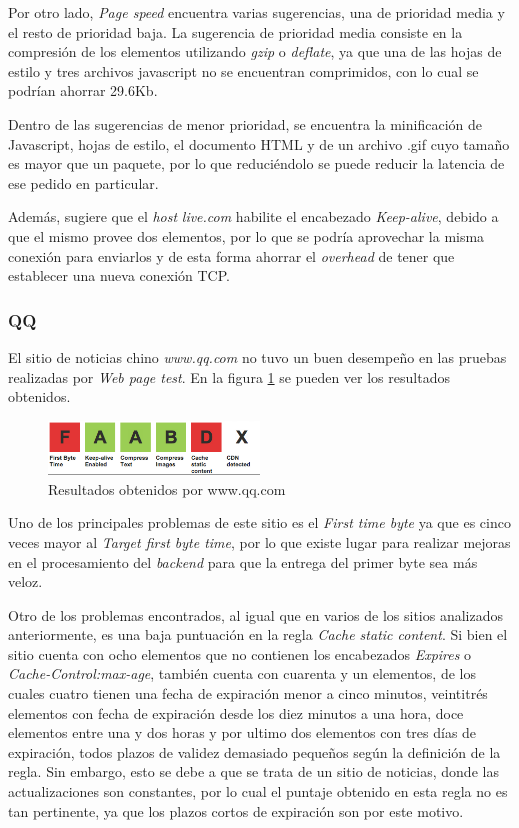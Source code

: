 Por otro lado, \emph{Page speed} encuentra varias sugerencias, una de prioridad media y el resto de prioridad baja. La sugerencia de prioridad media consiste en la compresión de
los elementos utilizando \emph{gzip} o \emph{deflate}, ya que una de las hojas de estilo y tres archivos javascript no se encuentran comprimidos, con lo cual se podrían ahorrar
29.6Kb.

Dentro de las sugerencias de menor prioridad, se encuentra la minificación de Javascript, hojas de estilo, el documento HTML y de un archivo .gif cuyo tamaño es mayor que un
paquete, por lo que reduciéndolo se puede reducir la latencia de ese pedido en particular.

Además, sugiere que el \emph{host} \emph{live.com} habilite el encabezado \emph{Keep-alive}, debido a que el mismo provee dos elementos, por lo que se podría
aprovechar la misma conexión para enviarlos y de esta forma ahorrar el \emph{overhead} de tener que establecer una nueva conexión TCP.

\subsubsection{QQ}

El sitio de noticias chino \emph{www.qq.com} no tuvo un buen desempeño en las pruebas realizadas por \emph{Web page test}. En la figura \ref{fig.qq_page_results} se pueden
ver los resultados obtenidos.

\begin{figure}[h]
\centering
\includegraphics[width=0.5\textwidth]{figuras/lado_cliente/qq/page_results.png}
  \caption{Resultados obtenidos por www.qq.com}
    \label{fig.qq_page_results}
\end{figure}

Uno de los principales problemas de este sitio es el \emph{First time byte} ya que es cinco veces mayor al \emph{Target first byte time}, por lo que existe lugar para realizar
mejoras en el procesamiento del \emph{backend} para que la entrega del primer byte sea más veloz.

Otro de los problemas encontrados, al igual que en varios de los sitios analizados anteriormente, es una baja puntuación en la regla \emph{Cache static content}. Si bien el
sitio cuenta con ocho elementos que no contienen los encabezados \emph{Expires} o \emph{Cache-Control:max-age}, también cuenta con cuarenta y un elementos, de los cuales
cuatro tienen una fecha de expiración menor a cinco minutos, veintitrés elementos con fecha de expiración desde los diez minutos a una hora, doce elementos entre una y dos horas
y por ultimo dos elementos con tres días de expiración, todos plazos de validez demasiado pequeños según la definición de la regla.
Sin embargo, esto se debe a que se trata de un sitio de noticias, donde  las actualizaciones son constantes, por lo cual el puntaje obtenido en esta regla no es tan pertinente, ya que
los plazos cortos de expiración son por este motivo.

